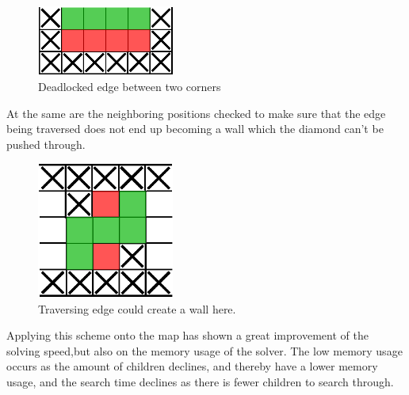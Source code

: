 %

\begin{figure}[H]
    \centering
        \includegraphics[width=0.40\textwidth]{images/deadlock_edge}
        \caption{Deadlocked edge between two corners}
\end{figure}


 At the same are the neighboring positions checked to make sure that the edge being traversed does not end up becoming a wall which the diamond can't be pushed through. \\

 
 \begin{figure}[H]
    \centering
        \includegraphics[width=0.40\textwidth]{images/deadlock_opposite}
        \caption{Traversing edge could create a wall here. }
\end{figure}
 
 
 Applying this scheme onto the map has shown a great improvement of the solving speed,but also on the memory usage of the solver. The low memory usage occurs as the amount of children declines, and thereby have a lower memory usage, and the search time declines as there is fewer children to search through. \\

